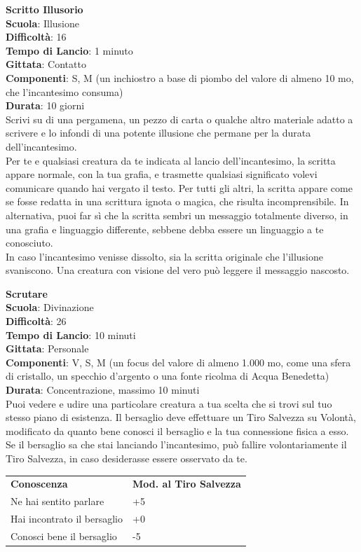 \begin{multicols}{2}
\medskip\textbf{Scritto Illusorio}\\
\textbf{Scuola}: Illusione\\
\textbf{Difficoltà}: 16\\
\textbf{Tempo di Lancio}: 1 minuto\\
\textbf{Gittata}: Contatto\\
\textbf{Componenti}: S, M (un inchiostro a base di piombo del valore di almeno 10 mo, che l'incantesimo consuma)\\
\textbf{Durata}: 10 giorni\\
Scrivi su di una pergamena, un pezzo di carta o qualche altro materiale adatto a scrivere e lo infondi di una potente illusione che permane per la durata dell'incantesimo.\\
Per te e qualsiasi creatura da te indicata al lancio dell'incantesimo, la scritta appare normale, con la tua grafia, e trasmette qualsiasi significato volevi comunicare quando hai vergato il testo. Per tutti gli altri, la scritta appare come se fosse redatta in una scrittura ignota o magica, che risulta incomprensibile. In alternativa, puoi far sì che la scritta sembri un messaggio totalmente diverso, in una grafia e linguaggio differente, sebbene debba essere un linguaggio a te conosciuto.\\
In caso l'incantesimo venisse dissolto, sia la scritta originale che l'illusione svaniscono. Una creatura con visione del vero può leggere il messaggio nascosto.

\medskip\textbf{Scrutare}\\
\textbf{Scuola}: Divinazione\\
\textbf{Difficoltà}: 26\\
\textbf{Tempo di Lancio}: 10 minuti\\
\textbf{Gittata}: Personale\\
\textbf{Componenti}: V, S, M (un focus del valore di almeno 1.000 mo, come una sfera di cristallo, un specchio d'argento o una fonte ricolma di Acqua Benedetta)\\
\textbf{Durata}: Concentrazione, massimo 10 minuti\\
Puoi vedere e udire una particolare creatura a tua scelta che si trovi sul tuo stesso piano di esistenza. Il bersaglio deve effettuare un Tiro Salvezza su Volontà, modificato da quanto bene conosci il bersaglio e la tua connessione fisica a esso. Se il bersaglio sa che stai lanciando l'incantesimo, può fallire volontariamente il Tiro Salvezza, in caso desiderasse essere osservato da
te.
\medskip
\begin{tabular}{ll}
\toprule
\textbf{Conoscenza} & \textbf{Mod. al Tiro Salvezza}\\
Ne hai sentito parlare &+5\\
Hai incontrato il bersaglio &+0\\
Conosci bene il bersaglio &-5\\
\end{tabular}


\end{multicols}
